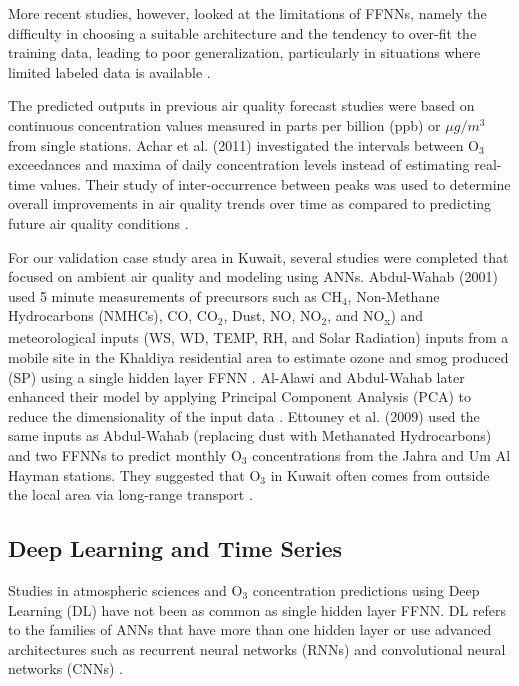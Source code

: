 More recent studies, however, looked at the limitations of FFNNs, namely the difficulty in choosing a suitable architecture and the tendency to over-fit the training data, leading to poor generalization, particularly in situations where limited labeled data is available \citep{Lu2005, Papaleonidas2013}.  

The predicted outputs in previous air quality forecast studies \citep{Arhami2013} were based on continuous concentration values measured in parts per billion (ppb) or $\mu g/m^{3}$ from single stations. Achar et al. (2011) investigated the intervals between O$_{3}$ exceedances and maxima of daily concentration levels instead of estimating real-time values. Their study of inter-occurrence between peaks was used to determine overall improvements in air quality trends over time as compared to predicting future air quality conditions \citep{Achcar2011}. 

For our validation case study area in Kuwait, several studies were completed that focused on ambient air quality and modeling using ANNs. Abdul-Wahab (2001) used 5 minute measurements of precursors such as CH$_{4}$, Non-Methane Hydrocarbons (NMHCs), CO, CO$_{2}$, Dust, NO, NO$_{2}$, and NO\textsubscript{x}) and meteorological inputs (WS, WD, TEMP, RH, and Solar Radiation) inputs from a mobile site in the Khaldiya residential area to estimate ozone and smog produced (SP)  using a single hidden layer FFNN \citep{AbdulWahab2001}. Al-Alawi and Abdul-Wahab later enhanced their model by applying Principal Component Analysis (PCA) to reduce the dimensionality of the input data \citep{AlAlawi2008}.  Ettouney et al. (2009) used the same inputs as Abdul-Wahab (replacing dust with Methanated Hydrocarbons) and two FFNNs to predict monthly O$_{3}$ concentrations from the Jahra and Um Al Hayman stations. They suggested that O$_{3}$ in Kuwait often comes from outside the local area via long-range transport \citep{Ettouney2009a}. 

\subsection{Deep Learning and Time Series}
Studies in atmospheric sciences and O$_{3}$ concentration predictions using Deep Learning (DL) have not been as common as single hidden layer FFNN. DL refers to the families of ANNs that have more than one hidden layer or use advanced architectures such as recurrent neural networks (RNNs) and convolutional neural networks (CNNs) \citep{Goodfellow2016}. 

